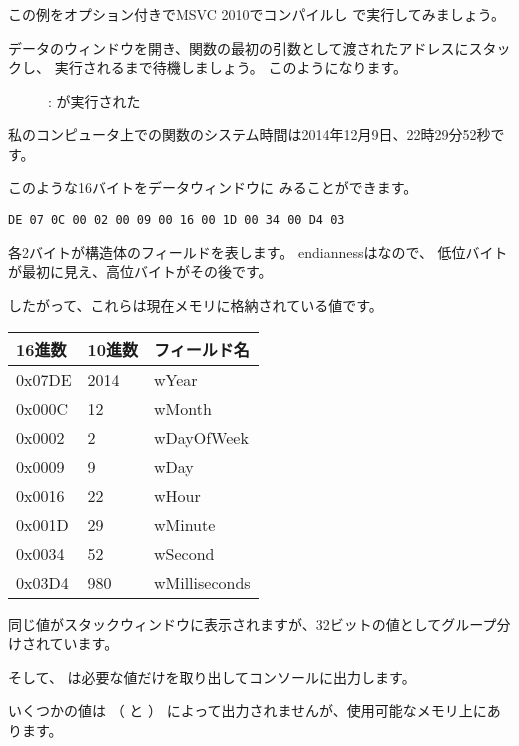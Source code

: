 ﻿\clearpage
\subsubsection{\olly}
\myindex{\olly}

この例をオプション付きでMSVC 2010でコンパイルし \olly で実行してみましょう。

データのウィンドウを開き、関数の最初の引数として渡されたアドレスにスタックし、
実行されるまで待機しましょう。 このようになります。

\begin{figure}[H]
\centering
{}
\caption{\olly:  が実行された}
\label{fig:struct_olly_1}
\end{figure}

私のコンピュータ上での関数のシステム時間は2014年12月9日、22時29分52秒です。



このような16バイトをデータウィンドウに
みることができます。
\begin{lstlisting}
DE 07 0C 00 02 00 09 00 16 00 1D 00 34 00 D4 03
\end{lstlisting}

各2バイトが構造体のフィールドを表します。
\gls{endianness}はなので、
低位バイトが最初に見え、高位バイトがその後です。

したがって、これらは現在メモリに格納されている値です。

\begin{center}
\begin{tabular}{ | l | l | l | }
\hline
\headercolor{} 16進数 & 
\headercolor{} 10進数 & 
\headercolor{} フィールド名 \\
\hline
0x07DE & 2014	& wYear \\
\hline
0x000C & 12	& wMonth \\
\hline
0x0002 & 2	& wDayOfWeek \\
\hline
0x0009 & 9	& wDay \\
\hline
0x0016 & 22	& wHour \\
\hline
0x001D & 29	& wMinute \\
\hline
0x0034 & 52	& wSecond \\
\hline	
0x03D4 & 980	& wMilliseconds \\
\hline
\end{tabular}
\end{center}

同じ値がスタックウィンドウに表示されますが、32ビットの値としてグループ分けされています。

そして、 \printf は必要な値だけを取り出してコンソールに出力します。

いくつかの値は \printf （ と ）
によって出力されませんが、使用可能なメモリ上にあります。
